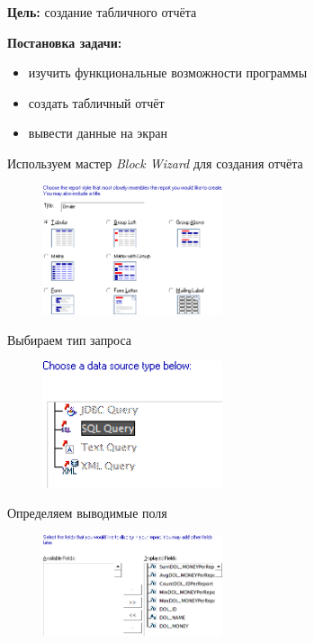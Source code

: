 \documentclass[pscyr, 12pt]{hedlab}
\begin{document}
    \makeheader
    \noindent\textbf{Цель:} создание табличного отчёта

    \noindent\textbf{Постановка задачи:}
    \vspace*{-1em}
    \begin{itemize}\itemsep-5pt
        \item изучить функциональные возможности программы
        \item создать табличный отчёт 
        \item вывести данные на экран
    \end{itemize}

    Используем мастер \emph{Block Wizard} для создания отчёта
    \begin{figure}[ht!]
        \center
        \includegraphics[width=0.47\textwidth]{lab06_01}
    \end{figure}

    Выбираем тип запроса
    \begin{figure}[ht!]
        \center
        \includegraphics[width=0.47\textwidth]{lab06_02}
    \end{figure}

    \pagebreak

    Определяем выводимые поля
    \begin{figure}[ht!]
        \center
        \includegraphics[width=0.47\textwidth]{lab06_03}
    \end{figure}
\end{document}
